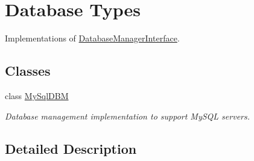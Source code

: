 \hypertarget{group__db__typedefs}{\section{Database Types}
\label{group__db__typedefs}
}


Implementations of \hyperlink{interfaceDatabaseManagerInterface}{Database\-Manager\-Interface}.  


\subsection*{Classes}
\begin{DoxyCompactItemize}
\item 
class \hyperlink{classMySqlDBM}{My\-Sql\-D\-B\-M}
\begin{DoxyCompactList}\small\item\em Database management implementation to support My\-S\-Q\-L servers. \end{DoxyCompactList}\end{DoxyCompactItemize}


\subsection{Detailed Description}
